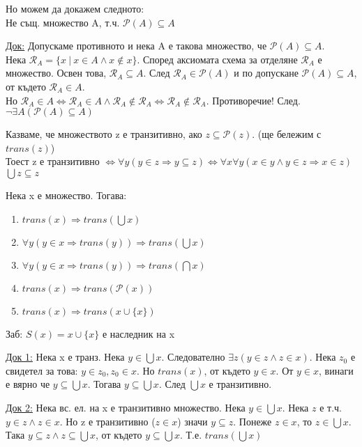 \documentclass[fleqn, titlepage, 12pt]{report}
\begin{document}
Но можем да докажем следното:\\
 Не същ. множество A, т.ч. $ \mathcal{P}(A) \subseteq A$
\bigbreak

\underline{Док:} Допускаме противното и нека A е такова множество, че $ \mathcal{P}(A) \subseteq A$.\\
Нека $ \mathcal{R}_A = \{x\ |\ x \in A \land x \notin x\}$.
Според аксиомата схема за отделяне $ \mathcal{R}_A$ е множество.
Освен това, $ \mathcal{R}_A \subseteq A$. След $ \mathcal{R}_A \in \mathcal{P}(A) $ и по допускане
$ \mathcal{P}(A) \subseteq A$, от където $ \mathcal{R}_A \in A$.\\
Но $ \mathcal{R}_A \in A \Leftrightarrow \mathcal{R}_A \in A \land \mathcal{R}_A \notin \mathcal{R}_A \Leftrightarrow 
\mathcal{R}_A \notin \mathcal{R}_A$. Противоречие! След. $ \lnot \exists{A} ( \mathcal{P}(A) \subseteq A)$
\bigbreak

 Казваме, че множеството z е транзитивно, ако $z \subseteq \mathcal{P}(z) $. (ще бележим с $trans(z)$)\\
Тоест z е транзитивно $ \Leftrightarrow \forall{y} (y \in z \Rightarrow y \subseteq z) \Leftrightarrow \forall{x} \forall{y} (x \in y \land y \in z \Rightarrow x \in z)$\\
$\bigcup{z} \subseteq z$
\bigbreak

 Нека x е множество. Тогава:
\begin{enumerate}
  \item $trans(x) \Rightarrow trans(\bigcup{x})$
  \item $ \forall{y} (y \in x \Rightarrow trans(y)) \Rightarrow trans(\bigcup{x})$
  \item $ \forall{y} (y \in x \Rightarrow trans(y)) \Rightarrow trans(\bigcap{x})$
  \item $trans(x) \Rightarrow trans( \mathcal{P}(x) )$
  \item $trans(x) \Rightarrow trans(x \cup \{ x\})$
\end{enumerate}
Заб: $S(x) = x \cup \{ x\}$ е наследник на x
\bigbreak

\underline{Док 1:} Нека x е транз. Нека $y \in \bigcup{x}$. Следователно $ \exists{z} (y \in z \land z \in x)$. Нека $z_0$
е свидетел за това: $y \in z_0, z_0 \in x$.
Но $trans(x)$, от където $y \in x$. От $y \in x$, винаги е вярно че $y \subseteq \bigcup{x} $.
Тогава $y \subseteq \bigcup{x} $. След $ \bigcup{x} $ е транзитивно.
\bigbreak

\underline{Док 2:} Нека вс. ел. на x е транзитивно множество. Нека $y \in \bigcup{x} $. Нека $z$ е т.ч. $y \in z \land z \in x$.
Но z е транзитивно ($z \in x$) значи $y \subseteq z$. Понеже $z \in x$, то $z \in \bigcup{x} $.
Така $y \subseteq z \land z \subseteq \bigcup{x} $, от където $y \subseteq \bigcup{x} $. Т.е. $trans( \bigcup{x} ) $
\bigbreak
\end{document}
